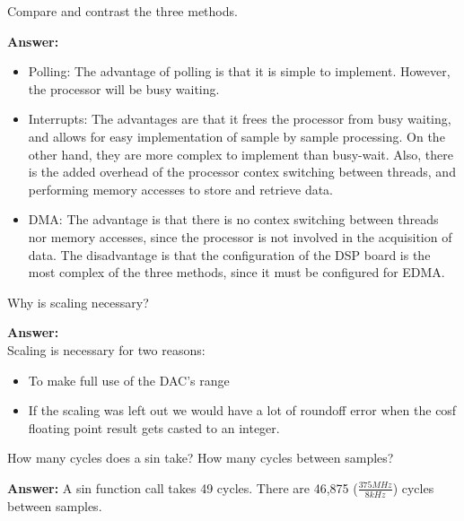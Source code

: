 \documentclass{article}
\begin{document}
\begin{enumerate}

  \begin{item}
    Compare and contrast the three methods.

  \textbf{Answer:}

    \begin{itemize}
      \item Polling: The advantage of polling is that it is simple to implement. However, the processor will be busy waiting.
      \item Interrupts: The advantages are that it frees the processor from busy waiting, and allows for easy implementation of sample by sample processing. 
        On the other hand, they are more complex to implement than busy-wait.
        Also, there is the added overhead of the processor contex switching between threads, and performing memory accesses to store and retrieve data.
      \item DMA: The advantage is that there is no contex switching between threads nor memory accesses, since the processor is not involved in the acquisition of data. 
        The disadvantage is that the configuration of the DSP board is the most complex of the three methods, since it must be configured for EDMA.
    \end{itemize}

  \end{item}

  \begin{item}
    Why is scaling necessary?

  \textbf{Answer:}\\
    Scaling is necessary for two reasons:
    \begin{itemize}
      \item To make full use of the DAC's range
      \item If the scaling was left out we would have a lot of roundoff error when the cosf floating point result gets casted to an integer.
    \end{itemize}


  \end{item}

  \begin{item}
    How many cycles does a sin take? How many cycles between samples?

  \textbf{Answer:}
    A sin function call takes 49 cycles.
    There are 46,875 ($\frac{375 MHz}{8 kHz}$) cycles between samples.

  \end{item}
\end{enumerate}





\end{document}
